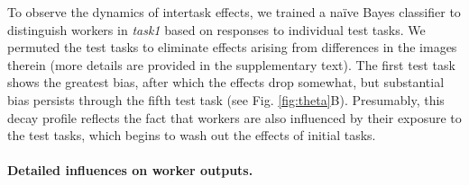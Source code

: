 \documentclass[12pt]{article}
\begin{document}
To observe the dynamics of intertask effects, we trained a na\"ive Bayes
classifier to distinguish workers in \textit{task1} based on responses to
individual test tasks.  We permuted 
the test tasks to eliminate effects arising from differences in the images 
therein (more details are provided in the supplementary text). The first test 
task shows the greatest bias, after which the effects drop somewhat, but 
substantial bias persists through the fifth test task
(see Fig. \ref{fig:theta}B).  Presumably, this decay profile reflects the
fact that workers are also influenced by their exposure to the test tasks, 
which begins to wash out the effects of initial tasks.

\paragraph{Detailed influences on worker outputs.} 
\end{document}
